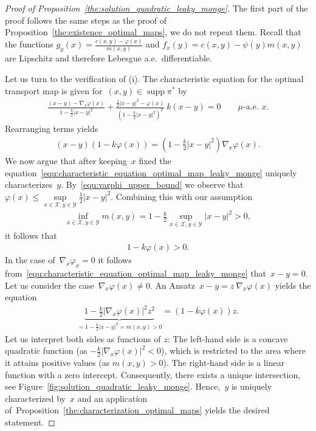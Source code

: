 \documentclass{article}
\theoremstyle{definition}
\DeclareMathOperator{\supp}{supp}
\begin{document}
    \begin{proof}[Proof of Proposition~\ref{the:solution_quadratic_leaky_monge}]
    The first part of the proof follows the same steps as the proof of Proposition~\ref{the:existence_optimal_maps}, we do not repeat them. Recall that the functions $g_y(x) = \frac{c(x,y)- \varphi(x)}{m(x,y)}$ and $f_x(y) = c(x,y) -  \psi(y) m(x,y)$ are Lipschitz and therefore Lebesgue a.e.~differentiable.
    
    
    
    Let us turn to the verification of (i). The characteristic equation for the optimal transport map is given for~$(x,y) \in \supp \pi^*$ by
    \begin{align}\label{equ:characteristic_equation_leaky_monge}
        \frac{(x-y) - \nabla_x \varphi (x)}{1- \frac{k}{2} |x-y|^2} + \frac{\frac{1}{2} |x-y|^2 - \varphi (x)}{\left( 1- \frac{k}{2}|x-y|^2\right)^2} \ k (x-y) = 0 \qquad \mbox{$\mu$-a.e.~$x$.}
    \end{align}
    Rearranging terms yields
    \begin{align}\label{equ:characteristic_equation_optimal_map_leaky_monge}
        (x-y) \left(1 - k \varphi(x) \right) =  \left( 1- \frac{k}{2}|x-y|^2 \right) \nabla_x \varphi(x).
    \end{align}
    We now argue that after keeping~$x$ fixed the equation~\eqref{equ:characteristic_equation_optimal_map_leaky_monge} uniquely characterizes~$y$. By~\eqref{equ:varphi_upper_bound}  we observe that~$\varphi(x) \leq \sup\limits_{x \in \mathcal{X} , y \in \mathcal{Y}} \frac{1}{2} |x-y|^2$. Combining this with our assumption
    \begin{align*}
            \inf_{x \in \mathcal{X} , y \in \mathcal{Y} } m(x,y) = 1-\frac{k}{2}\sup_{x\in \mathcal{X},y \in \mathcal{Y}}|x-y|^2 >0 ,
    \end{align*}
    it follows that 
    \begin{align}\label{equ:crucial_ingredient_non_perturbative}
        1 - k \varphi(x) >0.
    \end{align}
    In the case of~$\nabla_x \varphi_x =0$ it follows from~\eqref{equ:characteristic_equation_optimal_map_leaky_monge} that~$x-y=0$. Let us consider the case~$\nabla_x \varphi(x) \neq 0$. An Ansatz~$x-y = z \ \nabla_x \varphi(x)$ yields the equation
    \begin{align}
        \underbrace{1- \frac{k}{2}  |\nabla_x \varphi(x)|^2 z^2}_{ = 1- \frac{k}{2}|x-y|^2 = m(x,y) > 0} = (1 - k \varphi(x) ) z.
    \end{align}
    Let us interpret both sides as functions of $z$: The left-hand side is a concave quadratic function (as $- \frac{k}{2}  |\nabla_x \varphi(x)|^2 < 0$), which is restricted to the area where it attains positive values (as $m(x, y) > 0$). The right-hand side is a linear function with a zero intercept. Consequently, there exists a unique intersection, see Figure~\ref{fig:solution_quadratic_leaky_monge}. 
    Hence,~$y$ is uniquely characterized by~$x$ and an application of~Proposition~\ref{the:characterization_optimal_maps} yields the desired statement. \smallskip
    

\end{proof}
\end{document}
